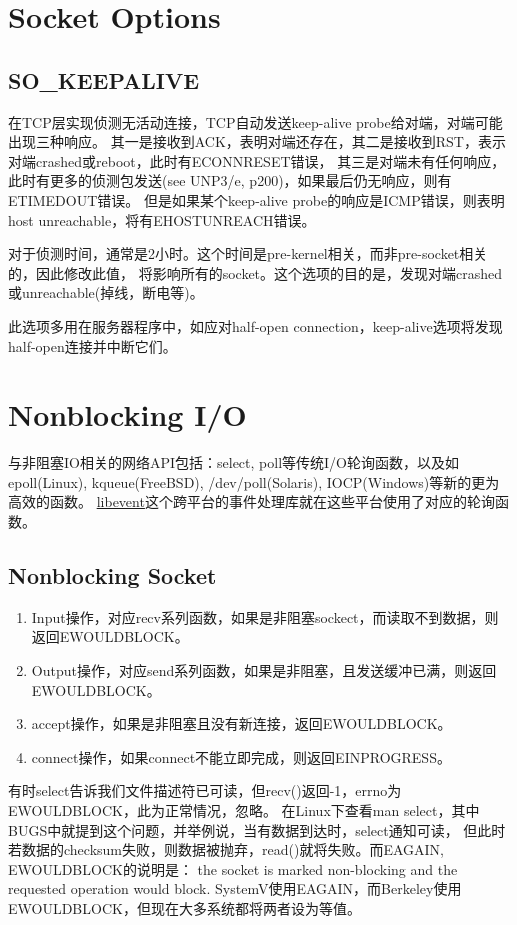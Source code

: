 \section{Socket Options}
\subsection{SO\_KEEPALIVE}
在TCP层实现侦测无活动连接，TCP自动发送keep-alive probe给对端，对端可能出现三种响应。
其一是接收到ACK，表明对端还存在，其二是接收到RST，表示对端crashed或reboot，此时有ECONNRESET错误，
其三是对端未有任何响应，此时有更多的侦测包发送(see UNP3/e, p200)，如果最后仍无响应，则有ETIMEDOUT错误。
但是如果某个keep-alive probe的响应是ICMP错误，则表明host unreachable，将有EHOSTUNREACH错误。

对于侦测时间，通常是2小时。这个时间是pre-kernel相关，而非pre-socket相关的，因此修改此值，
将影响所有的socket。这个选项的目的是，发现对端crashed或unreachable(掉线，断电等)。

此选项多用在服务器程序中，如应对half-open connection，keep-alive选项将发现half-open连接并中断它们。

\section{Nonblocking I/O}
与非阻塞IO相关的网络API包括：select, poll等传统I/O轮询函数，以及如
epoll(Linux), kqueue(FreeBSD), /dev/poll(Solaris), IOCP(Windows)等新的更为高效的函数。
\href{http://monkey.org/~provos/libevent/}{libevent}这个跨平台的事件处理库就在这些平台使用了对应的轮询函数。

\subsection{Nonblocking Socket}
\begin{enumerate}
\item Input操作，对应recv系列函数，如果是非阻塞sockect，而读取不到数据，则返回EWOULDBLOCK。
\item Output操作，对应send系列函数，如果是非阻塞，且发送缓冲已满，则返回EWOULDBLOCK。
\item accept操作，如果是非阻塞且没有新连接，返回EWOULDBLOCK。
\item connect操作，如果connect不能立即完成，则返回EINPROGRESS。
\end{enumerate}

有时select告诉我们文件描述符已可读，但recv()返回-1，errno为EWOULDBLOCK，此为正常情况，忽略。
在Linux下查看man select，其中BUGS中就提到这个问题，并举例说，当有数据到达时，select通知可读，
但此时若数据的checksum失败，则数据被抛弃，read()就将失败。而EAGAIN, EWOULDBLOCK的说明是：
the socket is marked non-blocking and the requested operation would block.
SystemV使用EAGAIN，而Berkeley使用EWOULDBLOCK，但现在大多系统都将两者设为等值。

